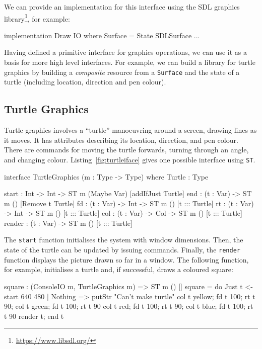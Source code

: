 We can provide an implementation for this interface using the SDL graphics
library\footnote{\url{https://www.libsdl.org/}}, for example:

\small
\begin{code}
implementation Draw IO where
  Surface = State SDLSurface
  ...
\end{code}
\normalsize

Having defined a primitive interface for graphics operations, we can use it
as a basis for more high level interfaces. For example, we can build a library
for turtle graphics by building a \emph{composite} resource from a
\texttt{Surface} and the state of a turtle (including location, direction and
pen colour).

\subsection{Turtle Graphics}

\label{sect:turtle}

Turtle graphics involves a ``turtle'' manoeuvring around a screen, drawing
lines as it moves. 
It has attributes describing its location, direction, and
pen colour. 
There are commands for moving the turtle forwards, turning through an angle,
and changing colour.
Listing~\ref{fig:turtleiface} gives one possible interface 
using \texttt{ST}.

\small
\begin{code}[float=h, frame=single,caption={An interface for turtle graphics,
supporting creating a turtle, drawing lines, and rendering the result},
label=fig:turtleiface]
interface TurtleGraphics (m : Type -> Type) where
  Turtle : Type

  start : Int -> Int -> ST m (Maybe Var) [addIfJust Turtle]
  end : (t : Var) -> ST m () [Remove t Turtle]
  fd : (t : Var) -> Int -> ST m () [t ::: Turtle]
  rt : (t : Var) -> Int -> ST m () [t ::: Turtle]
  col : (t : Var) -> Col -> ST m () [t ::: Turtle]
  render : (t : Var) -> ST m () [t ::: Turtle]
\end{code}
\normalsize

The \texttt{start} function initialises the system with window dimensions. 
Then, the state of the
turtle can be updated by issuing commands. Finally, the \texttt{render}
function displays the picture drawn so far in a window. The following
function, for example, initialises a turtle and, if successful, draws a
coloured square:

\small
\begin{code}
square : (ConsoleIO m, TurtleGraphics m) => ST m () []
square = do Just t <- start 640 480 | Nothing => putStr "Can't make turtle\n"
            col t yellow; fd t 100; rt t 90; col t green; fd t 100; rt t 90
            col t red; fd t 100; rt t 90; col t blue; fd t 100; rt t 90
            render t; end t
\end{code}
\normalsize

